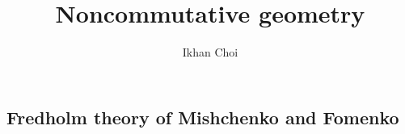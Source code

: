 \documentclass{../../large}
\begin{document}
\title{Noncommutative geometry}
\author{Ikhan Choi}
\maketitle
\tableofcontents


\chapter{}


\section{Fredholm theory of Mishchenko and Fomenko}
\end{document}
